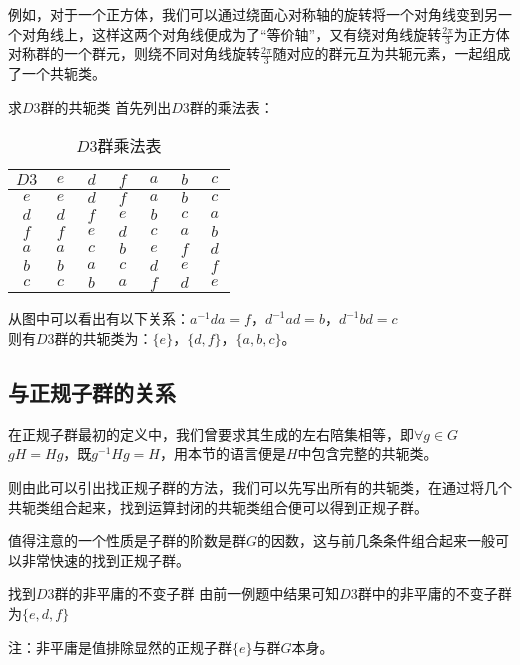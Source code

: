 例如，对于一个正方体，我们可以通过绕面心对称轴的旋转将一个对角线变到另一个对角线上，这样这两个对角线便成为了“等价轴”，又有绕对角线旋转$\frac{2\pi}{3}$为正方体对称群的一个群元，则绕不同对角线旋转$\frac{2\pi}{3}$随对应的群元互为共轭元素，一起组成了一个共轭类。

\begin{example}{求$D3$群的共轭类}
首先列出$D3$群的乘法表：
\begin{table}[ht]
\centering
\caption{$D3$群乘法表}\label{gpcon_tab1}
\begin{tabular}{|c|c|c|c|c|c|c|}
\hline
        $D3$ & $~e~$ & $~d~$ & $~f~$ & $~a~$ & $~b~$ & $~c~$ \\ \hline
        $e$ & $e$ & $d$ & $f$ & $a$ & $b$ & $c$ \\ \hline
        $d$ & $d$ & $f$ & $e$ & $b$ & $c$ & $a$ \\ \hline
        $f$ & $f$ & $e$ & $d$ & $c$ & $a$ & $b$ \\ \hline
        $a$ & $a$ & $c$ & $b$ & $e$ & $f$ & $d$ \\ \hline
        $b$ & $b$ & $a$ & $c$ & $d$ & $e$ & $f$ \\ \hline
        $c$ & $c$ & $b$ & $a$ & $f$ & $d$ & $e$ \\ \hline
\end{tabular}
\end{table}

从图中可以看出有以下关系：$a^{-1}da=f$，$d^{-1}ad=b$，$d^{-1}bd=c$\\
则有$D3$群的共轭类为：$\{e\}$，$\{d,f\}$，$\{a,b,c\}$。
\end{example}

\subsection{与正规子群的关系}
在正规子群最初的定义中，我们曾要求其生成的左右陪集相等，即$\forall g \in G$ \\
$gH=Hg$，既$g^{-1}Hg=H$，用本节的语言便是$H$中包含完整的共轭类。

则由此可以引出找正规子群的方法，我们可以先写出所有的共轭类，在通过将几个共轭类组合起来，找到运算封闭的共轭类组合便可以得到正规子群。

值得注意的一个性质是子群的阶数是群$G$的因数，这与前几条条件组合起来一般可以非常快速的找到正规子群。

\begin{example}{找到$D3$群的非平庸的不变子群}
由前一例题中结果可知$D3$群中的非平庸的不变子群为$\{e,d,f\}$

注：非平庸是值排除显然的正规子群$\{e\}$与群$G$本身。
\end{example}